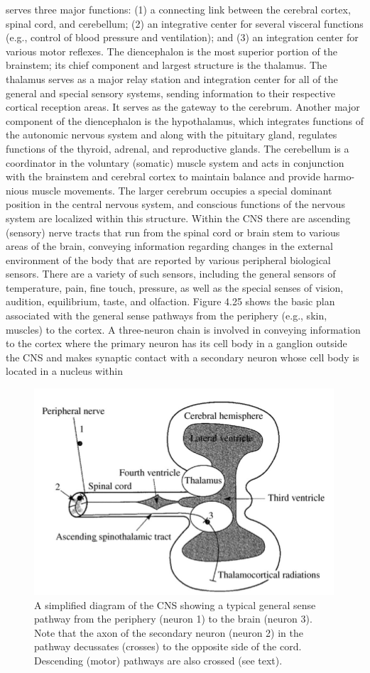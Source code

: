 serves three major functions: (1) a connecting link between the cerebral cortex,
spinal cord, and cerebellum; (2) an integrative center for several visceral
functions (e.g., control of blood pressure and ventilation); and (3) an integration
center for various motor reflexes. The diencephalon is the most superior portion
of the brainstem; its chief component and largest structure is the thalamus. The
thalamus serves as a major relay station and integration center for all of the
general and special sensory systems, sending information to their respective
cortical reception areas. It serves as the gateway to the cerebrum. Another major
component of the diencephalon is the hypothalamus, which integrates functions
of the autonomic nervous system and along with the pituitary gland, regulates
functions of the thyroid, adrenal, and reproductive glands. The cerebellum is a
coordinator in the voluntary (somatic) muscle system and acts in conjunction
with the brainstem and cerebral cortex to maintain balance and provide harmo-
nious muscle movements. The larger cerebrum occupies a special dominant
position in the central nervous system, and conscious functions of the nervous
system are localized within this structure.
Within the CNS there are ascending (sensory) nerve tracts that run from
the spinal cord or brain stem to various areas of the brain, conveying
information regarding changes in the external environment of the body that
are reported by various peripheral biological sensors. There are a variety of
such sensors, including the general sensors of temperature, pain, fine touch,
pressure, as well as the special senses of vision, audition, equilibrium, taste, and
olfaction. Figure 4.25 shows the basic plan associated with the general sense
pathways from the periphery (e.g., skin, muscles) to the cortex. A three-neuron
chain is involved in conveying information to the cortex where the primary
neuron has its cell body in a ganglion outside the CNS and makes synaptic
contact with a secondary neuron whose cell body is located in a nucleus within

\begin{figure}
\centering
\includegraphics[width=0.7\linewidth]{figura_2.png} 
\caption{A simplified diagram of the CNS showing a typical general sense
pathway from the periphery (neuron 1) to the brain (neuron 3). Note that the
axon of the secondary neuron (neuron 2) in the pathway decussates (crosses) to
the opposite side of the cord. Descending (motor) pathways are also crossed
(see text).}
\end{figure}

